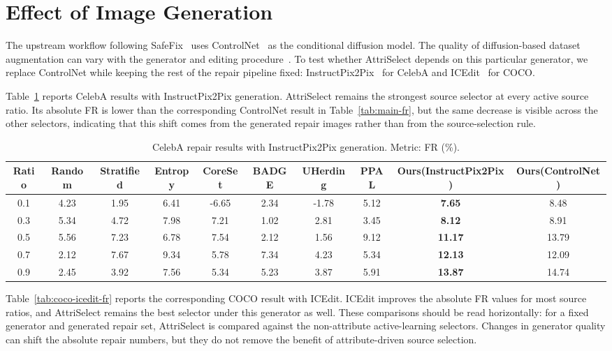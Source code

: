 \documentclass{article}
\newcommand{\model}{AttriSelect\xspace}
\newcommand{\safefix}{SafeFix\xspace}
\newcommand{\controlnet}{ControlNet\xspace}
\begin{document}
\section{Effect of Image Generation}
\label{app:image-generation-effect}

The upstream workflow following \safefix~\citep{xu2025safefix} uses \controlnet~\citep{zhang2023adding} as the conditional diffusion model. The quality of diffusion-based dataset augmentation can vary with the generator and editing procedure~\citep{trabucco2023effective,dunlap2023diversify,wang2024domain}. To test whether \model depends on this particular generator, we replace \controlnet while keeping the rest of the repair pipeline fixed: InstructPix2Pix~\citep{brooks2023instructpix2pix} for CelebA and ICEdit~\citep{zhang2025icedit} for COCO.

Table~\ref{tab:celeba-instructpix2pix-fr} reports CelebA results with InstructPix2Pix generation. \model remains the strongest source selector at every active source ratio. Its absolute FR is lower than the corresponding \controlnet result in Table~\ref{tab:main-fr}, but the same decrease is visible across the other selectors, indicating that this shift comes from the generated repair images rather than from the source-selection rule.

\begin{table}[h]
\centering
\caption{CelebA repair results with InstructPix2Pix generation. Metric: FR (\%).}
\label{tab:celeba-instructpix2pix-fr}
\footnotesize
\setlength{\tabcolsep}{3pt}
\begin{tabular}{c c c c c c c c c | c}
\toprule
Ratio & Random & Stratified & Entropy & CoreSet & BADGE & UHerding & PPAL & Ours(InstructPix2Pix) & Ours(ControlNet) \\
\midrule
0.1 & 4.23 & 1.95 & 6.41 & -6.65 & 2.34 & -1.78 & 5.12 & \textbf{7.65} & 8.48 \\
0.3 & 5.34 & 4.72 & 7.98 & 7.21 & 1.02 & 2.81 & 3.45 & \textbf{8.12} & 8.91 \\
0.5 & 5.56 & 7.23 & 6.78 & 7.54 & 2.12 & 1.56 & 9.12 & \textbf{11.17} & 13.79 \\
0.7 & 2.12 & 7.67 & 9.34 & 5.78 & 7.34 & 4.23 & 5.34 & \textbf{12.13} & 12.09 \\
0.9 & 2.45 & 3.92 & 7.56 & 5.34 & 5.23 & 3.87 & 5.91 & \textbf{13.87} & 14.74 \\
\bottomrule
\end{tabular}
\end{table}

Table~\ref{tab:coco-icedit-fr} reports the corresponding COCO result with ICEdit. ICEdit improves the absolute FR values for most source ratios, and \model remains the best selector under this generator as well. These comparisons should be read horizontally: for a fixed generator and generated repair set, \model is compared against the non-attribute active-learning selectors. Changes in generator quality can shift the absolute repair numbers, but they do not remove the benefit of attribute-driven source selection.
\end{document}
